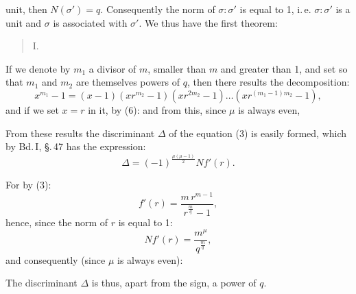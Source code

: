 unit, then $N(\sigma') = q$. Consequently the norm of $\sigma : \sigma'$ is equal to 1, i.\,e. $\sigma : \sigma'$ is a unit and $\sigma$ is associated with $\sigma'$. We thus have the first theorem:

\begin{quote}
I. 
\end{quote}

If we denote by $m_1$ a divisor of $m$, smaller than $m$ and greater than 1, and set
so that $m_1$ and $m_2$ are themselves powers of $q$, then there results the decomposition:
\[
x^{m_1} - 1 = (x-1)(xr^{m_2}-1)(xr^{2m_2}-1)\ldots(xr^{(m_1-1)m_2}-1),
\]
and if we set $x = r$ in it, by (6):
and from this, since $\mu$ is always even,

From these results the discriminant $\Delta$ of the equation (3) is easily formed, which by Bd.\,I, \S.\,47 has the expression:
\[
\Delta = (-1)^{\frac{\mu(\mu-1)}{2}} N f'(r).
\]

For by (3):
\[
f'(r) = \dfrac{m\,r^{m-1}}{r^{\frac{m}{q}} - 1},
\]
hence, since the norm of $r$ is equal to 1:
\[
N f'(r) = \dfrac{m^{\mu}}{q^{\frac{m}{q}}},
\]
and consequently (since $\mu$ is always even):

The discriminant $\Delta$ is thus, apart from the sign, a power of $q$.
